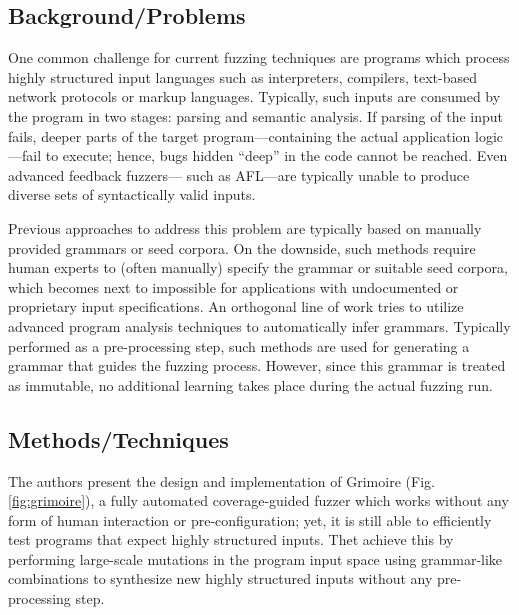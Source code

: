 \subsection{Background/Problems}
One common challenge for current fuzzing techniques are programs which process highly structured input languages such as interpreters, compilers, text-based network protocols or markup languages. Typically, such inputs are consumed by the program in two stages: parsing and semantic analysis. If parsing of the input fails, deeper parts of the target program—containing the actual application logic—fail to execute; hence, bugs hidden “deep” in the code cannot be reached. Even advanced feedback fuzzers— such as AFL—are typically unable to produce diverse sets of syntactically valid inputs.

Previous approaches to address this problem are typically based on manually provided grammars or seed corpora. On the downside, such methods require human experts to (often manually) specify the grammar or suitable seed corpora, which becomes next to impossible for applications with undocumented or proprietary input specifications. An orthogonal line of work tries to utilize advanced program analysis techniques to automatically infer grammars. Typically performed as a pre-processing step, such methods are used for generating a grammar that guides the fuzzing process. However, since this grammar is treated as immutable, no additional learning takes place during the actual fuzzing run.

\subsection{Methods/Techniques}
The authors present the design and implementation of Grimoire (Fig.\ref{fig:grimoire}), a fully automated coverage-guided fuzzer which works without any form of human interaction or pre-configuration; yet, it is still able to efficiently test programs that expect highly structured inputs. Thet achieve this by performing large-scale mutations in the program input space using grammar-like combinations to synthesize new highly structured inputs without any pre-processing step. 

